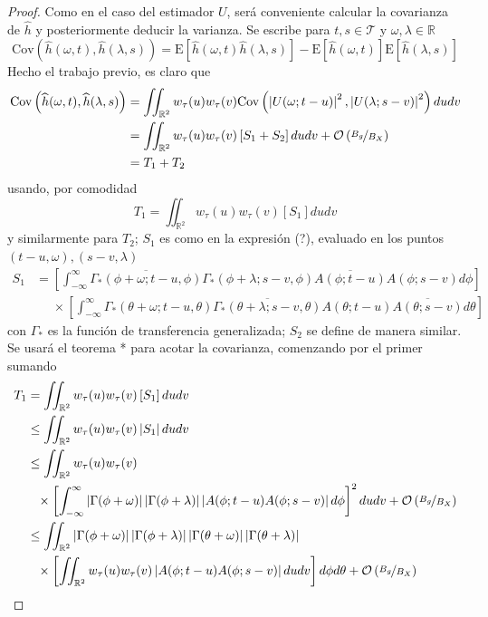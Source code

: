 \documentclass[12pt,letterpaper]{book}
\newcommand{\R}{\mathbb{R}}
\newcommand{\intR}{\int_{-\infty}^{\infty}}
\newcommand{\E}[1]{\mathrm{E}\left[ #1 \right]}
\newcommand{\Cov}[1]{\mathrm{Cov}\left( #1 \right)}
\newcommand{\abso}[1]{\left| #1 \right|}
\newcommand{\orden}[1]{\mathcal{O}\left( #1 \right)}
\newcommand{\pheq}{\phantom{=}}
\begin{document}
\begin{proof}
Como en el caso del estimador $U$, será conveniente calcular la covarianza de $\widehat{h}$ y posteriormente deducir la varianza. Se escribe para $t, s \in \mathcal{T}$ y $\omega, \lambda \in \R$
\begin{equation}
\Cov{\widehat{h}(\omega, t),\widehat{h}(\lambda, s)} = \E{\widehat{h}(\omega, t)\widehat{h}(\lambda, s)} - \E{\widehat{h}(\omega, t)}\E{\widehat{h}(\lambda, s)}
\end{equation}
Hecho el trabajo previo, es claro que
\begin{align*}
\Cov{\widehat{h}(\omega, t), \widehat{h}(\lambda, s)} &=
\iint_{\R^{2}} w_\tau(u) w_\tau(v) \Cov{\abso{U(\omega; t-u)}^{2},\abso{U(\lambda; s-v)}^{2}} du dv \\
&=
\iint_{\R^{2}} w_\tau(u) w_\tau(v) \left[ S_1 + S_2 \right] du dv + \orden{\nicefrac{B_g}{B_X}} \\
&= T_1 + T_2
\end{align*}
usando, por comodidad
\begin{equation}
T_1 = \iint_{\R^{2}} w_\tau(u) w_\tau(v) \left[ S_1 \right] du dv
\end{equation}
y similarmente para $T_2$; $S_1$ es como en la expresión (?), evaluado en los puntos $(t-u,\omega), (s-v, \lambda)$
\begin{align*}
S_1 &=
 \left[ \intR \overline{\Gamma_*(\phi + \omega; t-u, \phi)} \Gamma_*(\phi+ \lambda; s-v, \phi)
 \overline{A(\phi; t-u)} A(\phi; s-v) d\phi \right] \\
 &\pheq \times \left[ \intR \Gamma_*(\theta+ \omega; t-u, \theta) 
  \overline{\Gamma_*(\theta + \lambda; s-v, \theta)}  
 A(\theta; t-u)   \overline{A(\theta; s-v)} d\theta \right] 
\end{align*}
con $\Gamma_*$ es la función de transferencia generalizada; $S_2$ se define de manera similar.
Se usará el teorema * para acotar la covarianza, comenzando por el primer sumando
\begin{align*}
T_1 &= 
\iint_{\R^{2}} w_\tau(u) w_\tau(v) \left[ S_1 \right] du dv \\
&\leq
\iint_{\R^{2}} w_\tau(u) w_\tau(v) \abso{ S_1 } du dv \\
&\leq 
\iint_{\R^{2}} 
w_\tau(u) w_\tau(v) \\
&\pheq 
 \times \left[ \intR
 \abso{\Gamma(\phi + \omega)} \abso{\Gamma(\phi+ \lambda)}
 \abso{A(\phi; t-u) A(\phi; s-v)} d\phi \right]^{2}
 du dv + \orden{\nicefrac{B_g}{B_X}} \\
&\leq 
\iint_{\R^{2}} \abso{\Gamma(\phi + \omega)} \abso{\Gamma(\phi+ \lambda)}
\abso{\Gamma(\theta + \omega)} \abso{\Gamma(\theta+ \lambda)} \\
&\pheq 
 \times \left[ \iint_{\R^{2}}  w_\tau(u) w_\tau(v)
 \abso{A(\phi; t-u) A(\phi; s-v)} du dv \right]
 d\phi d\theta + \orden{\nicefrac{B_g}{B_X}} \\
\end{align*}
\end{proof}
\end{document}
